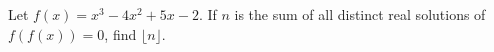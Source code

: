 Let $f(x)=x^3-4x^2+5x-2$. If $n$ is the sum of all distinct real solutions of $f(f(x))=0$, find $\lfloor n\rfloor$.
